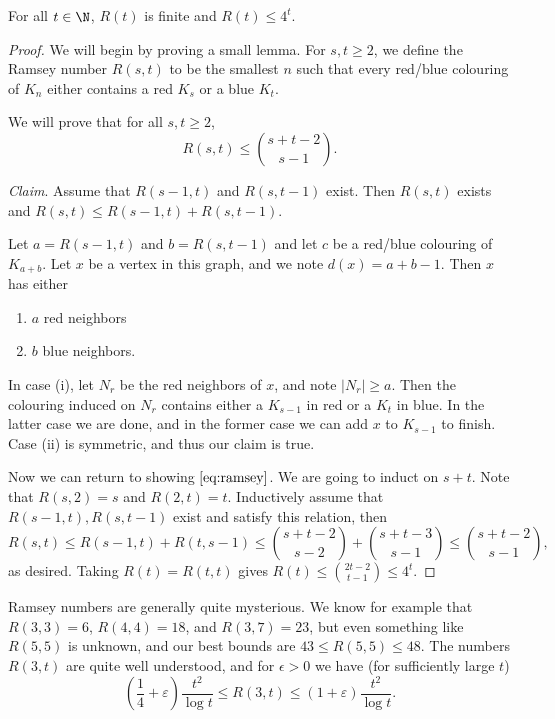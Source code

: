 \begin{theorem}
	For all $t \in \N$, $R(t)$ is finite and $R(t) \leq 4^t$.
\end{theorem}
\begin{proof}
	We will begin by proving a small lemma. For $s, t \geq 2$, we define the Ramsey number $R(s, t)$ to be the smallest $n$ such that every red/blue colouring of $K_n$ either contains a red $K_s$ or a blue $K_t$.

	We will prove that for all $s, t \geq 2$,
	\begin{equation}\label{eq:ramsey}
		R(s, t) \leq \binom{s + t - 2}{s - 1}.\tag{$\dagger$}
	\end{equation}

	\emph{Claim}. Assume that $R(s - 1, t)$ and $R(s, t - 1)$ exist. Then $R(s, t)$ exists and $R(s, t) \leq R(s-1, t) + R(s, t - 1)$.

	Let $a = R(s - 1, t)$ and $b = R(s, t - 1)$ and let $c$ be a red/blue colouring of $K_{a + b}$. Let $x$ be a vertex in this graph, and we note $d(x) = a + b - 1$. Then $x$ has either
	\begin{enumerate}[label=(\roman*)]
		\item $a$ red neighbors
		\item $b$ blue neighbors.
	\end{enumerate}
	In case (i), let $N_r$ be the red neighbors of $x$, and note $|N_r| \geq a$. Then the colouring induced on $N_r$ contains either a $K_{s - 1}$ in red or a $K_{t}$ in blue. In the latter case we are done, and in the former case we can add $x$ to $K_{s - 1}$ to finish. Case (ii) is symmetric, and thus our claim is true.

	Now we can return to showing $\eqref{eq:ramsey}$. We are going to induct on $s + t$. Note that $R(s, 2) = s$ and $R(2, t) = t$. Inductively assume that $R(s - 1, t), R(s, t - 1)$ exist and satisfy this relation, then
	$$
	R(s, t) \leq R(s - 1, t) + R(t, s - 1) \leq \binom{s + t - 2}{s - 2} + \binom{s + t - 3}{s - 1} \leq \binom{s + t - 2}{s - 1},
	$$
	as desired. Taking $R(t) = R(t, t)$ gives $R(t) \leq \binom{2t - 2}{t - 1} \leq 4^t$.
\end{proof}

Ramsey numbers are generally quite mysterious.
We know for example that
$R(3,3) = 6$, $R(4,4) = 18$, and $R(3,7) = 23$, 
but even something like $R(5, 5)$ is unknown, and our best bounds are $43 \leq R(5, 5) \leq 48$. The numbers $R(3, t)$ are quite well understood, and for $\epsilon > 0$ we have (for sufficiently large $t$)
$$
\left(\frac{1}{4}+\varepsilon\right) \frac{t^{2}}{\log t} \leqslant R(3, t) \leqslant(1+\varepsilon) \frac{t^{2}}{\log t}.
$$

